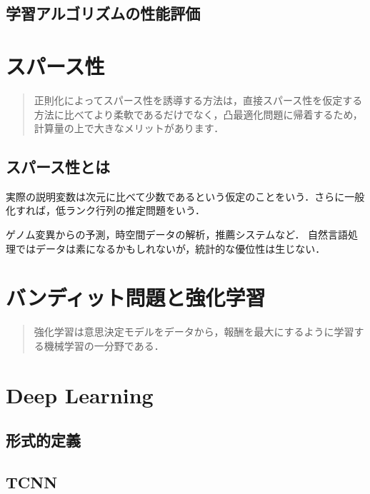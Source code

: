 \documentclass[uplatex,dvipdfmx]{jsreport}
\begin{document}
\section{学習アルゴリズムの性能評価}

\chapter{スパース性}

\begin{quotation}
    正則化によってスパース性を誘導する方法は，直接スパース性を仮定する方法に比べてより柔軟であるだけでなく，凸最適化問題に帰着するため，計算量の上で大きなメリットがあります．
\end{quotation}

\section{スパース性とは}

\begin{definition}
    実際の説明変数は次元に比べて少数であるという仮定のことをいう．さらに一般化すれば，低ランク行列の推定問題をいう．
\end{definition}
\begin{example}
    ゲノム変異からの予測，時空間データの解析，推薦システムなど．
    自然言語処理ではデータは素になるかもしれないが，統計的な優位性は生じない．
\end{example}

\chapter{バンディット問題と強化学習}

\begin{quotation}
    強化学習は意思決定モデルをデータから，報酬を最大にするように学習する機械学習の一分野である．
    
\end{quotation}

\chapter{Deep Learning}

\section{形式的定義}

\section{TCNN}
\end{document}
